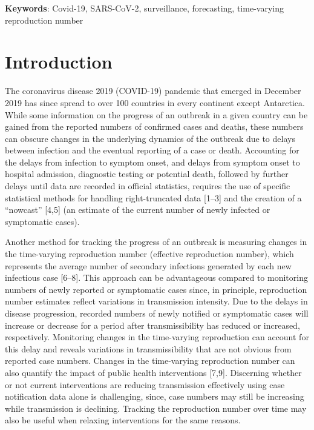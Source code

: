 \documentclass[]{article}
\begin{document}
\textbf{Keywords}: Covid-19, SARS-CoV-2, surveillance, forecasting,
time-varying reproduction number

\hypertarget{introduction}{%
\section{Introduction}\label{introduction}}

The coronavirus disease 2019 (COVID-19) pandemic that emerged in
December 2019 has since spread to over 100 countries in every continent
except Antarctica. While some information on the progress of an outbreak
in a given country can be gained from the reported numbers of confirmed
cases and deaths, these numbers can obscure changes in the underlying
dynamics of the outbreak due to delays between infection and the
eventual reporting of a case or death. Accounting for the delays from
infection to symptom onset, and delays from symptom onset to hospital
admission, diagnostic testing or potential death, followed by further
delays until data are recorded in official statistics, requires the use
of specific statistical methods for handling right-truncated data
{[}1--3{]} and the creation of a ``nowcast'' {[}4,5{]} (an estimate of
the current number of newly infected or symptomatic cases).

Another method for tracking the progress of an outbreak is measuring
changes in the time-varying reproduction number (effective reproduction
number), which represents the average number of secondary infections
generated by each new infectious case {[}6--8{]}. This approach can be
advantageous compared to monitoring numbers of newly reported or
symptomatic cases since, in principle, reproduction number estimates
reflect variations in transmission intensity. Due to the delays in
disease progression, recorded numbers of newly notified or symptomatic
cases will increase or decrease for a period after transmissibility has
reduced or increased, respectively. Monitoring changes in the
time-varying reproduction can account for this delay and reveals
variations in transmissibility that are not obvious from reported case
numbers. Changes in the time-varying reproduction number can also
quantify the impact of public health interventions {[}7,9{]}. Discerning
whether or not current interventions are reducing transmission
effectively using case notification data alone is challenging, since,
case numbers may still be increasing while transmission is declining.
Tracking the reproduction number over time may also be useful when
relaxing interventions for the same reasons.
\end{document}
